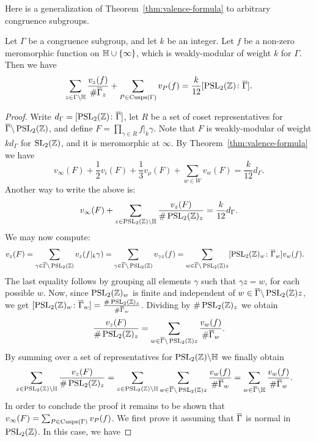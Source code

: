 Here is a generalization of Theorem~\ref{thm:valence-formula} to arbitrary congruence subgroups.
\begin{theorem}
  Let $\Gamma$ be a congruence subgroup, and let $k$ be an integer. Let $f$ be a non-zero meromorphic function on $\mathbb{H}\cup\{\infty\}$, which is weakly-modular of weight $k$ for $\Gamma$. Then we have
\[
\sum_{z\in\Gamma\backslash\mathbb{H}} \frac{v_z(f)}{\#\overline{\Gamma}_z} +\sum_{P\in\operatorname{Cusps}(\Gamma)} v_P(f)=\frac{k}{12}[\operatorname{PSL}_2(\mathbb{Z})\colon\overline{\Gamma}].
\]
\end{theorem}
\begin{proof}
  Write $d_\Gamma=[\operatorname{PSL}_2(\mathbb{Z})\colon\overline{\Gamma}]$, let $R$ be a set of coset representatives for $\overline{\Gamma}\backslash\operatorname{PSL}_2(\mathbb{Z})$, and define $F=\prod_{\gamma\in R} f|_k\gamma$. Note that $F$ is weakly-modular of weight $kd_\Gamma$ for $\operatorname{SL}_2(\mathbb{Z})$, and it is meromorphic at $\infty$. By Theorem~\ref{thm:valence-formula} we have
\[
v_\infty(F)+\frac 12 v_i(F) + \frac 13 v_\rho(F) +\sum_{w\in W} v_w(F) = \frac{k}{12} d_\Gamma.
\]
Another way to write the above is:
\[
 v_\infty(F) + \sum_{z\in\operatorname{PSL}_2(\mathbb{Z})\backslash\mathbb{H}} \frac{v_z(F)}{\#\operatorname{PSL}_2(\mathbb{Z})_z} = \frac{k}{12} d_\Gamma.
\]
We may now compute:
\begin{align*}
v_z(F) &= \sum_{\gamma\in\overline{\Gamma}\backslash\operatorname{PSL}_2(\mathbb{Z})} v_z(f|_k\gamma) = \sum_{\gamma\in\overline{\Gamma}\backslash\operatorname{PSL}_2(\mathbb{Z})} v_{\gamma z}(f)=\sum_{w\in\overline{\Gamma}\backslash \operatorname{PSL}_2(\mathbb{Z})z} [\operatorname{PSL}_2(\mathbb{Z})_w\colon\overline{\Gamma}_w] v_w(f).
\end{align*}
The last equality follows by grouping all elements $\gamma$ such that $\gamma z=w$, for each possible $w$. Now, since $\operatorname{PSL}_2(\mathbb{Z})_w$ is finite and independent of $w\in \overline{\Gamma}\backslash\operatorname{PSL}_2(\mathbb{Z})z$, we get
$[\operatorname{PSL}_2(\mathbb{Z})_w\colon\overline{\Gamma}_w]=\frac{\# \operatorname{PSL}_2(\mathbb{Z})_z}{\#\overline{\Gamma}_w}$.
Dividing by $\#\operatorname{PSL}_2(\mathbb{Z})_z$ we obtain
\[
\frac{v_z(F)}{\#\operatorname{PSL}_2(\mathbb{Z})_z} = \sum_{w\in \overline{\Gamma}\backslash \operatorname{PSL}_2(\mathbb{Z})z} \frac{v_w(f)}{\#\overline{\Gamma}_w}.
\]
By summing over a set of representatives for $\operatorname{PSL}_2(\mathbb{Z})\backslash \mathbb{H}$ we finally obtain
\begin{align*}
\sum_{z\in\operatorname{PSL}_2(\mathbb{Z})\backslash\mathbb{H}} \frac{v_z(F)}{\#\operatorname{PSL}_2(\mathbb{Z})_z} &=\sum_{z\in\operatorname{PSL}_2(\mathbb{Z})\backslash \mathbb{H}}\sum_{w\in\overline{\Gamma}\backslash \operatorname{PSL}_2(\mathbb{Z})z} \frac{v_w(f)}{\#\overline{\Gamma}_w}=\sum_{w\in\overline{\Gamma}\backslash\mathbb{H}} \frac{v_w(f)}{\#\overline{\Gamma}_w}.
\end{align*}
In order to conclude the proof it remains to be shown that $v_\infty(F) = \sum_{P\in\operatorname{Cusps}(\Gamma)} v_P(f)$. We first prove it assuming that $\overline{\Gamma}$ is normal in $\operatorname{PSL}_2(\mathbb{Z})$. In this case, we have

\end{proof}
